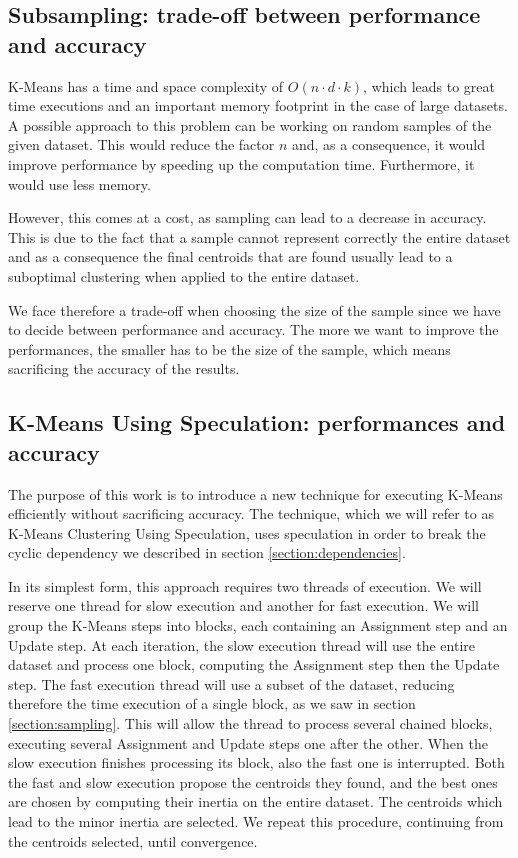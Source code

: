 \label{section:dependencies}

\subsection{Subsampling: trade-off between performance and accuracy}

K-Means has a time and space complexity of $O(n\cdot d\cdot k)$, which leads to great time executions and an important memory footprint in the case of large datasets. 
A possible approach to this problem can be working on random samples of the given dataset. This would reduce the factor $n$ and, as a consequence, it would improve performance by speeding up the computation time. Furthermore, it would use less memory. 

However, this comes at a cost, as sampling can lead to a decrease in accuracy. This is due to the fact that a sample cannot represent correctly the entire dataset and as a consequence the final centroids that are found usually lead to a suboptimal clustering when applied to the entire dataset.

We face therefore a trade-off when choosing the size of the sample since we have to decide between performance and accuracy. The more we want to improve the performances, the smaller has to be the size of the sample, which means sacrificing the accuracy of the results.
\label{section:sampling}

\subsection{K-Means Using Speculation: performances and accuracy}

The purpose of this work is to introduce a new technique for executing K-Means efficiently without sacrificing accuracy. The technique, which we will refer to as K-Means Clustering Using Speculation, uses speculation in order to break the cyclic dependency we described in section \ref{section:dependencies}.

In its simplest form, this approach requires two threads of execution. We will reserve one thread for slow execution and another for fast execution. We will group the K-Means steps into blocks, each containing an Assignment step and an Update step. At each iteration, the slow execution thread will use the entire dataset and process one block, computing the Assignment step then the Update step. The fast execution thread will use a subset of the dataset, reducing therefore the time execution of a single block, as we saw in section \ref{section:sampling}. This will allow the thread to process several chained blocks, executing several Assignment and Update steps one after the other.
When the slow execution finishes processing its block, also the fast one is interrupted.
Both the fast and slow execution propose the centroids they found, and the best ones are chosen by computing their inertia on the entire dataset. The centroids which lead to the minor inertia are selected.
We repeat this procedure, continuing from the centroids selected, until convergence.


